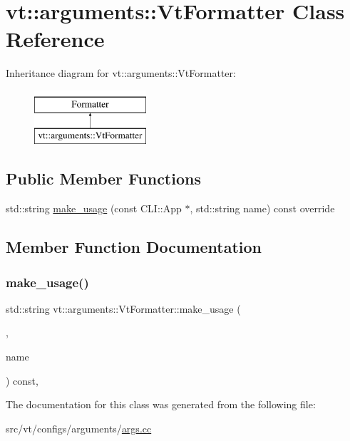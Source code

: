 \hypertarget{classvt_1_1arguments_1_1_vt_formatter}{}\section{vt\+:\+:arguments\+:\+:Vt\+Formatter Class Reference}
\label{classvt_1_1arguments_1_1_vt_formatter}
Inheritance diagram for vt\+:\+:arguments\+:\+:Vt\+Formatter\+:\begin{figure}[H]
\begin{center}
\leavevmode
\includegraphics[height=2.000000cm]{classvt_1_1arguments_1_1_vt_formatter}
\end{center}
\end{figure}
\subsection*{Public Member Functions}
\begin{DoxyCompactItemize}
\item 
std\+::string \hyperlink{classvt_1_1arguments_1_1_vt_formatter_aaa983b6deb448bcb84691f65e6f2ec12}{make\+\_\+usage} (const C\+L\+I\+::\+App $\ast$, std\+::string name) const override
\end{DoxyCompactItemize}


\subsection{Member Function Documentation}
\mbox{\label{classvt_1_1arguments_1_1_vt_formatter_aaa983b6deb448bcb84691f65e6f2ec12}} 
\subsubsection{\texorpdfstring{make\+\_\+usage()}{make\_usage()}}
{\footnotesize\ttfamily std\+::string vt\+::arguments\+::\+Vt\+Formatter\+::make\+\_\+usage (\begin{DoxyParamCaption}\item[{const C\+L\+I\+::\+App $\ast$}]{,  }\item[{std\+::string}]{name }\end{DoxyParamCaption}) const\hspace{0.3cm}{\ttfamily [inline]}, {\ttfamily [override]}}



The documentation for this class was generated from the following file\+:\begin{DoxyCompactItemize}
\item 
src/vt/configs/arguments/\hyperlink{args_8cc}{args.\+cc}\end{DoxyCompactItemize}
